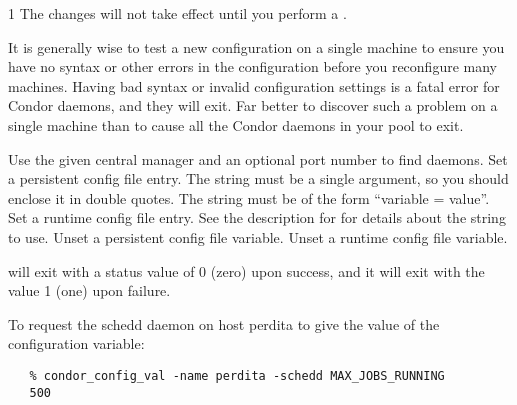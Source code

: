 \begin{ManPage}{\label{man-condor-config-val}}{1}
\Note The changes will not take effect until you perform a
.

\Note It is generally wise to test a new configuration on a single
machine to ensure you have no syntax or other errors in the
configuration before you reconfigure many machines.  
Having bad syntax or invalid configuration settings is a fatal error
for Condor daemons, and they will exit.
Far better to discover such a problem on a single machine than to
cause all the Condor daemons in your pool to exit.

\begin{Options}
	   { Use the given central manager and an optional port number
	   to find daemons. }
	 { Set a persistent
	config file entry.
	The string must be a single argument, so you should enclose it
	in double quotes.
	The string must be of the form ``variable = value''. }
	 { Set a runtime
	config file entry.
	See the description for  for details about the
	string to use. } 
	 { Unset a persistent
	config file variable. }
	 { Unset a runtime
	config file variable. }
\end{Options}

\ExitStatus

 will exit with a status value of 0 (zero) upon success,
and it will exit with the value 1 (one) upon failure.

\Examples

To request the schedd daemon on host perdita
to give the value of the
configuration variable:
\begin{verbatim}
   % condor_config_val -name perdita -schedd MAX_JOBS_RUNNING
   500
\end{verbatim}


\end{ManPage}
